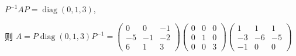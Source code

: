 \begin{enumerate}
                   \( P^{-1}AP = \operatorname{diag}(0, 1, 3) \),

                   则 \( A = P\operatorname{diag}(0, 1, 3)P^{-1} = \begin{pmatrix}
                       0  & 0  & -1 \\
                       -5 & -1 & -2 \\
                       6  & 1  & 3
                   \end{pmatrix}\begin{pmatrix}
                       0 & 0 & 0 \\
                       0 & 1 & 0 \\
                       0 & 0 & 3
                   \end{pmatrix}\begin{pmatrix}
                       1  & 1  & 1  \\
                       -3 & -6 & -5 \\
                       -1 & 0  & 0
                   \end{pmatrix} \)


\end{enumerate}
